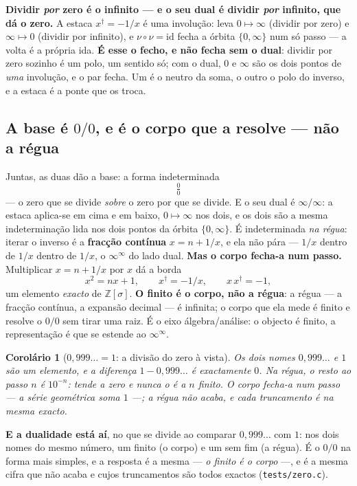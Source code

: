 \documentclass[11pt,a4paper]{article}
\newcommand{\code}[1]{\texttt{\small #1}}
\newtheorem{corolario}[teorema]{Corolário}
\newcommand{\dg}{^{\dagger}}
\begin{document}
\textbf{Dividir \emph{por} zero é o infinito --- e o seu dual é dividir \emph{por} infinito, que dá o
zero.} A estaca $x\dg=-1/x$ é uma involução: leva $0\mapsto\infty$ (dividir por zero) e $\infty\mapsto0$
(dividir por infinito), e $\nu\circ\nu=\mathrm{id}$ fecha a órbita $\{0,\infty\}$ num só passo --- a volta
é a própria ida. \textbf{É esse o fecho, e não fecha sem o dual}: dividir por zero sozinho é um polo, um
sentido só; com o dual, $0$ e $\infty$ são os dois pontos de \emph{uma} involução, e o par fecha. Um é o
neutro da soma, o outro o polo do inverso, e a estaca é a ponte que os troca.

\subsection*{A base é $0/0$, e é o corpo que a resolve --- não a régua}

Juntas, as duas dão a base: a forma indeterminada
\[
  \boxed{\;\tfrac00\;}
\]
--- o zero que se divide \emph{sobre} o zero por que se divide. E o seu dual é $\infty/\infty$: a estaca
aplica-se em cima e em baixo, $0\mapsto\infty$ nos dois, e os dois são a mesma indeterminação lida nos
dois pontos da órbita $\{0,\infty\}$. É indeterminada \emph{na régua}: iterar o inverso é a
\textbf{fracção contínua} $x=n+1/x$, e ela não pára --- $1/x$ dentro de $1/x$ dentro de $1/x$, o
$\infty^{\infty}$ do lado dual. \textbf{Mas o corpo fecha-a num passo.} Multiplicar $x=n+1/x$
por $x$ dá a borda
\[
  x^2=nx+1,\qquad x\dg=-1/x,\qquad x\,x\dg=-1,
\]
um elemento \emph{exacto} de $\mathbb{Z}[\sigma]$. \textbf{O finito é o corpo, não a régua}: a régua --- a
fracção contínua, a expansão decimal --- é infinita; o corpo que ela mede é finito e resolve o $0/0$ sem
tirar uma raiz. É o eixo álgebra/análise: o objecto é finito, a representação é que se estende ao
$\infty^{\infty}$.

\begin{corolario}[$0{,}999\ldots=1$: a divisão do zero à vista]\label{cor:noves}
Os dois nomes $0{,}999\ldots$ e $1$ são \emph{um} elemento, e a diferença $1-0{,}999\ldots$ é
\emph{exactamente} $0$. Na régua, o resto ao passo $n$ é $10^{-n}$: tende a zero e nunca o \emph{é} a $n$
finito. O corpo fecha-a num passo --- a série geométrica soma $1$ ---; a régua não acaba, e cada
truncamento é na mesma exacto.
\end{corolario}

\noindent \textbf{E a dualidade está aí}, no que se divide ao comparar $0{,}999\ldots$ com $1$: nos dois
nomes do mesmo número, um finito (o corpo) e um sem fim (a régua). É o $0/0$ na forma mais simples, e a
resposta é a mesma --- \emph{o finito é o corpo} ---, e é a mesma cifra que não acaba e cujos truncamentos
são todos exactos (\code{tests/zero.c}).
\end{document}
